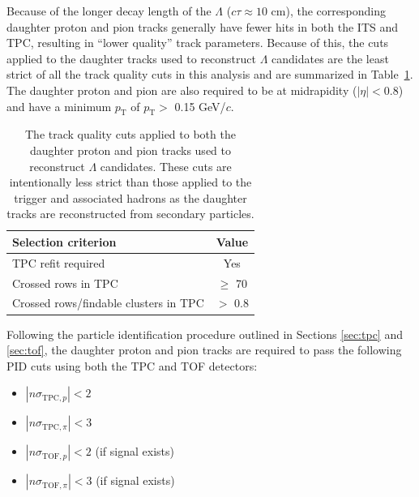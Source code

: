 Because of the longer decay length of the $\Lambda$ ($c\tau \approx 10$ cm), the corresponding daughter proton and pion tracks generally have fewer hits in both the ITS and TPC, resulting in ``lower quality'' track parameters. Because of this, the cuts applied to the daughter tracks used to reconstruct $\Lambda$ candidates are the least strict of all the track quality cuts in this analysis and are summarized in Table~\ref{tab:lambda_daughter_track_cuts}. The daughter proton and pion are also required to be at midrapidity ($|\eta| < 0.8$) and have a minimum $p_{\text{T}}$ of $p_{\text{T}} >$ 0.15 GeV/$c$. 

\begin{table}[h]
	\centering
	\caption{The track quality cuts applied to both the daughter proton and pion tracks used to reconstruct $\Lambda$ candidates. These cuts are intentionally less strict than those applied to the trigger and associated hadrons as the daughter tracks are reconstructed from secondary particles.}
	\label{tab:lambda_daughter_track_cuts}
	\begin{tabular}{ l  c }
		\hline
		Selection criterion & Value \\
		\hline
		TPC refit required & Yes \\
		Crossed rows in TPC & $\geq$ 70 \\
		Crossed rows/findable clusters in TPC & $>$ 0.8 \\
		\hline
	\end{tabular}
\end{table}

Following the particle identification procedure outlined in Sections \ref{sec:tpc} and \ref{sec:tof}, the daughter proton and pion tracks are required to pass the following PID cuts using both the TPC and TOF detectors:

\begin{itemize}
	\item $|n\sigma_{\text{TPC}, p}| < 2$
	\item $|n\sigma_{\text{TPC}, \pi}| < 3$
	\item $|n\sigma_{\text{TOF}, p}| < 2$ (if signal exists)
	\item $|n\sigma_{\text{TOF}, \pi}| < 3$ (if signal exists)
\end{itemize}

